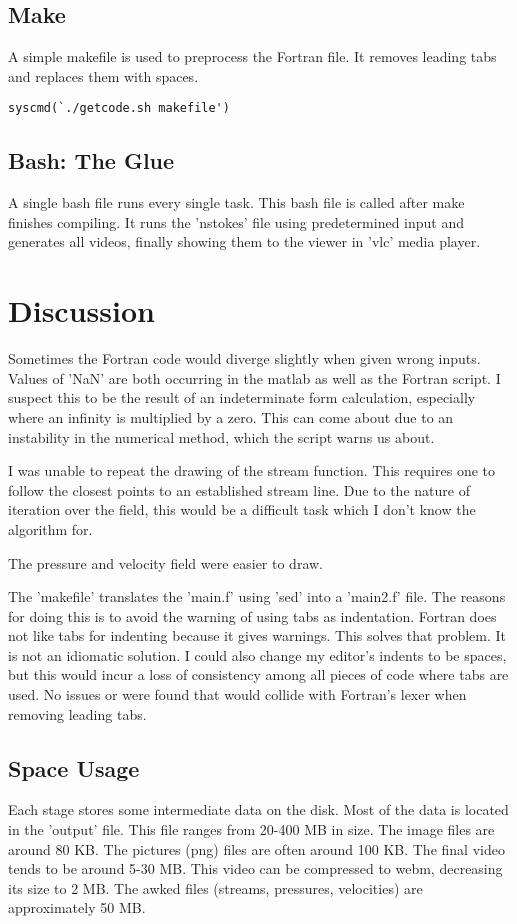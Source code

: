 \documentclass[listof=totoc]{report}
\begin{document}
\section{Make}
A simple makefile is used to preprocess the Fortran file. It removes leading tabs and replaces them with spaces.

\begin{verbatim}
syscmd(`./getcode.sh makefile')
\end{verbatim}

\section{Bash: The Glue}
A single bash file runs every single task. This bash file is called after make finishes compiling. It runs the 'nstokes' file using predetermined input and generates all videos, finally showing them to the viewer in 'vlc' media player.

\chapter{Discussion}
Sometimes the Fortran code would diverge slightly when given wrong inputs. Values of 'NaN' are both occurring in the matlab as well as the Fortran script. I suspect this to be the result of an indeterminate form calculation, especially where an infinity is multiplied by a zero. This can come about due to an instability in the numerical method, which the script warns us about.

I was unable to repeat the drawing of the stream function. This requires one to follow the closest points to an established stream line. Due to the nature of iteration over the field, this would be a difficult task which I don't know the algorithm for.

The pressure and velocity field were easier to draw.

The 'makefile' translates the 'main.f' using 'sed' into a 'main2.f' file. The reasons for doing this is to avoid the warning of using tabs as indentation. Fortran does not like tabs for indenting because it gives warnings. This solves that problem. It is not an idiomatic solution. I could also change my editor's indents to be spaces, but this would incur a loss of consistency among all pieces of code where tabs are used. No issues or were found that would collide with Fortran's lexer when removing leading tabs.

\section{Space Usage}
Each stage stores some intermediate data on the disk. Most of the data is located in the 'output' file. This file ranges from 20-400 MB in size. The image files are around 80 KB. The pictures (png) files are often around 100 KB. The final video tends to be around 5-30 MB. This video can be compressed to webm, decreasing its size to 2 MB. The awked files (streams, pressures, velocities) are approximately 50 MB.
\end{document}
